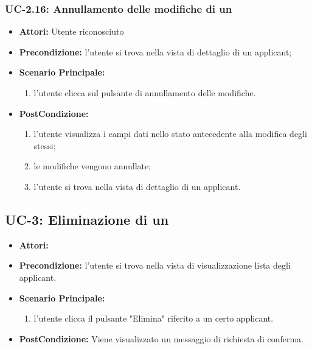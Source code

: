 \subsubsection{UC-2.16: Annullamento delle modifiche di un \applicant}
\begin{itemize}
	\item \textbf{Attori:} Utente riconosciuto
	\item \textbf{Precondizione:}  l'utente si trova nella vista di dettaglio di un applicant;
	\item \textbf{Scenario Principale:}
	\begin{enumerate}
		\item l'utente clicca sul pulsante di annullamento delle modifiche.
	\end{enumerate}
	\item \textbf{PostCondizione:} 
	\begin{enumerate}
		\item l'utente visualizza i campi dati nello stato antecedente alla modifica degli stessi;
		\item le modifiche vengono annullate;
		\item l'utente si trova nella vista di dettaglio di un applicant.
	\end{enumerate}
	
\end{itemize}



\subsection{UC-3: Eliminazione di un\applicant}
\begin{itemize}
\item \textbf{Attori:}\loggedusr
\item \textbf{Precondizione:} l'utente si trova nella vista di visualizzazione lista degli applicant.
\item \textbf{Scenario Principale:}
\begin{enumerate}
	\item l'utente clicca il pulsante "Elimina" riferito a un certo applicant.
\end{enumerate}
\item \textbf{PostCondizione:} Viene visualizzato un messaggio di richiesta di conferma.
\end{itemize}

